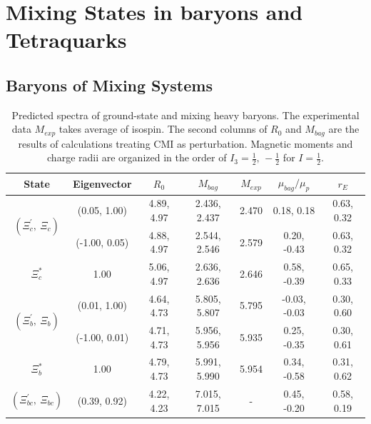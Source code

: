 \documentclass[prd,twocolumn,floatfix,nofootinbib]{revtex4}
\begin{document}
\section{Mixing States in baryons and Tetraquarks}\label{Hadrons}
\subsection{Baryons of Mixing Systems}
\renewcommand{\tabcolsep}{0.62cm}
\renewcommand{\arraystretch}{1.3}
\begin{table}[!htbp]
    \caption{Predicted spectra of ground-state and mixing heavy baryons. The experimental data $M_{exp}$ takes average of isospin. 
    The second columns of $R_{0}$ and $M_{bag}$ are the results of calculations treating CMI as perturbation. 
    Magnetic moments and charge radii are organized in the order of $I_{3}=\frac{1}{2},\,-\frac{1}{2}$ for $I=\frac{1}{2}$.}
    \label{tab:mixingbaryon}
    \begin{tabular}{ccccccc}
        \hline\hline
        {\rm State}         &{\rm Eigenvector}  &$R_{0}$        &$M_{bag}$          &$M_{exp}$  &$\mu_{bag}/\mu_{p}$    &$r_{E}$ \\ \hline
        \multirow{2}{*}{$\left(\Xi_{c}^{\prime},\ \Xi_{c}\right)$}
                            &(0.05, 1.00)       &4.89, 4.97	    &2.436, 2.437	    &2.470      &0.18, 0.18             &0.63, 0.32 \\
                            &(-1.00, 0.05)      &4.88, 4.97	    &2.544, 2.546	    &2.579      &0.20, -0.43            &0.63, 0.32 \\
        $\Xi_{c}^{\ast}$ 	&1.00               &5.06, 4.97	    &2.636, 2.636	    &2.646      &0.58, -0.39            &0.65, 0.33 \\
        \multirow{2}{*}{$\left(\Xi_{b}^{\prime},\ \Xi_{b}\right)$}
                            &(0.01, 1.00)       &4.64, 4.73	    &5.805, 5.807	    &5.795      &-0.03, -0.03           &0.30, 0.60 \\
                            &(-1.00, 0.01)      &4.71, 4.73	    &5.956, 5.956	    &5.935      &0.25, -0.35            &0.30, 0.61 \\
        $\Xi_{b}^{\ast}$ 	&1.00               &4.79, 4.73	    &5.991, 5.990	    &5.954      &0.34, -0.58            &0.31, 0.62 \\
        \multirow{2}{*}{$\left(\Xi_{bc}^{\prime},\ \Xi_{bc}\right)$}
                            &(0.39, 0.92)       &4.22, 4.23	    &7.015, 7.015	    &-          &0.45, -0.20            &0.58, 0.19 \\

\end{tabular}
\end{table}
\end{document}
